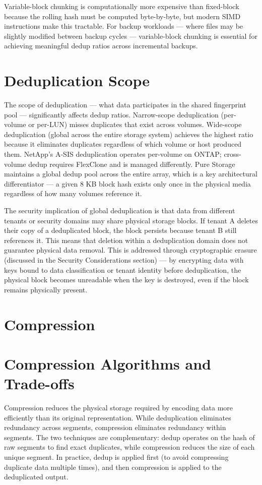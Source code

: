 Variable-block chunking is computationally more expensive than fixed-block because the rolling hash must be computed byte-by-byte, but modern SIMD instructions make this tractable. For backup workloads --- where files may be slightly modified between backup cycles --- variable-block chunking is essential for achieving meaningful dedup ratios across incremental backups.

\section{Deduplication Scope}
The scope of deduplication --- what data participates in the shared fingerprint pool --- significantly affects dedup ratios. Narrow-scope deduplication (per-volume or per-LUN) misses duplicates that exist across volumes. Wide-scope deduplication (global across the entire storage system) achieves the highest ratio because it eliminates duplicates regardless of which volume or host produced them. NetApp's A-SIS deduplication operates per-volume on ONTAP; cross-volume dedup requires FlexClone and is managed differently. Pure Storage maintains a global dedup pool across the entire array, which is a key architectural differentiator --- a given 8 KB block hash exists only once in the physical media regardless of how many volumes reference it.

The security implication of global deduplication is that data from different tenants or security domains may share physical storage blocks. If tenant A deletes their copy of a deduplicated block, the block persists because tenant B still references it. This means that deletion within a deduplication domain does not guarantee physical data removal. This is addressed through cryptographic erasure (discussed in the Security Considerations section) --- by encrypting data with keys bound to data classification or tenant identity before deduplication, the physical block becomes unreadable when the key is destroyed, even if the block remains physically present.

\section{Compression}
\section{Compression Algorithms and Trade-offs}
Compression reduces the physical storage required by encoding data more efficiently than its original representation. While deduplication eliminates redundancy across segments, compression eliminates redundancy within segments. The two techniques are complementary: dedup operates on the hash of raw segments to find exact duplicates, while compression reduces the size of each unique segment. In practice, dedup is applied first (to avoid compressing duplicate data multiple times), and then compression is applied to the deduplicated output.


